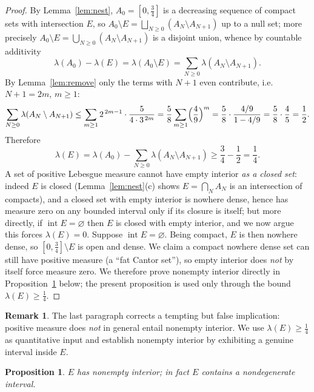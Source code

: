 \documentclass{amsart}
\newtheorem{proposition}{Proposition}
\theoremstyle{definition}
\newtheorem{remark}{Remark}
\begin{document}
\begin{proof}
By Lemma~\ref{lem:nest}, $A_0=[0,\tfrac34]$ is a decreasing sequence of compact sets with
intersection $E$, so $A_0\setminus E=\bigsqcup_{N\ge0}(A_N\setminus A_{N+1})$ up to a null set; more
precisely $A_0\setminus E=\bigcup_{N\ge0}(A_N\setminus A_{N+1})$ is a disjoint union, whence by
countable additivity
\[
  \lambda(A_0)-\lambda(E)=\lambda(A_0\setminus E)=\sum_{N\ge0}\lambda(A_N\setminus A_{N+1}).
\]
By Lemma~\ref{lem:remove} only the terms with $N+1$ even contribute, i.e. $N+1=2m$, $m\ge1$:
\[
  \sum_{N\ge0}\lambda(A_N\setminus A_{N+1})
   \le\sum_{m\ge1}2^{\,2m-1}\cdot\frac{5}{4\cdot3^{\,2m}}
   =\frac58\sum_{m\ge1}\Bigl(\frac49\Bigr)^{m}
   =\frac58\cdot\frac{4/9}{1-4/9}
   =\frac58\cdot\frac45=\frac12 .
\]
Therefore
\[
  \lambda(E)=\lambda(A_0)-\sum_{N\ge0}\lambda(A_N\setminus A_{N+1})\ge\frac34-\frac12=\frac14 .
\]
A set of positive Lebesgue measure cannot have empty interior \emph{as a closed set}: indeed $E$ is
closed (Lemma~\ref{lem:nest}(c) shows $E=\bigcap_N A_N$ is an intersection of compacts), and a closed
set with empty interior is nowhere dense, hence has measure zero on any bounded interval only if its
closure is itself; but more directly, if $\operatorname{int}E=\varnothing$ then $E$ is closed with
empty interior, and we now argue this forces $\lambda(E)=0$. Suppose $\operatorname{int}E=\varnothing$.
Being compact, $E$ is then nowhere dense, so $[0,\tfrac34]\setminus E$ is open and dense. We claim a
compact nowhere dense set can still have positive measure (a ``fat Cantor set''), so empty interior
does \emph{not} by itself force measure zero. We therefore prove nonempty interior directly in
Proposition~\ref{prop:interval} below; the present proposition is used only through the bound
$\lambda(E)\ge\frac14$.
\end{proof}

\begin{remark}
The last paragraph corrects a tempting but false implication: positive measure does \emph{not} in
general entail nonempty interior. We use $\lambda(E)\ge\frac14$ as quantitative input and establish
nonempty interior by exhibiting a genuine interval inside $E$.
\end{remark}

\begin{proposition}\label{prop:interval}
$E$ has nonempty interior; in fact $E$ contains a nondegenerate interval.
\end{proposition}
\end{document}
